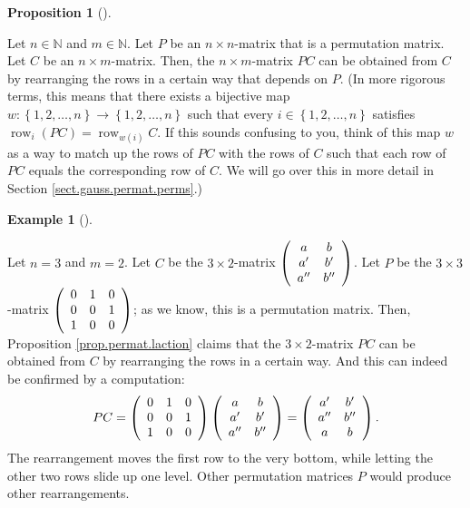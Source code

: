 \documentclass[numbers=enddot,12pt,final,onecolumn,notitlepage]{scrartcl}%
\theoremstyle{definition}
\newtheorem{prop}[theo]{Proposition}
\newenvironment{proposition}[1][]
{\begin{prop}[#1]\begin{leftbar}}
{\end{leftbar}\end{prop}}
\newtheorem{exam}[theo]{Example}
\newenvironment{example}[1][]
{\begin{exam}[#1]\begin{leftbar}}
{\end{leftbar}\end{exam}}
\begin{document}
\begin{proposition}
\label{prop.permat.laction}Let $n\in\mathbb{N}$ and $m\in\mathbb{N}$. Let $P$
be an $n\times n$-matrix that is a permutation matrix. Let $C$ be an $n\times
m$-matrix. Then, the $n\times m$-matrix $PC$ can be obtained from $C$ by
rearranging the rows in a certain way that depends on $P$. (In more rigorous
terms, this means that there exists a bijective map $w:\left\{  1,2,\ldots
,n\right\}  \rightarrow\left\{  1,2,\ldots,n\right\}  $ such that every
$i\in\left\{  1,2,\ldots,n\right\}  $ satisfies $\operatorname*{row}%
\nolimits_{i}\left(  PC\right)  =\operatorname*{row}\nolimits_{w\left(
i\right)  }C$. If this sounds confusing to you, think of this map $w$ as a way
to match up the rows of $PC$ with the rows of $C$ such that each row of $PC$
equals the corresponding row of $C$. We will go over this in more detail in
Section \ref{sect.gauss.permat.perms}.)
\end{proposition}

\begin{example}
Let $n=3$ and $m=2$. Let $C$ be the $3\times2$-matrix $\left(
\begin{array}
[c]{cc}%
a & b\\
a^{\prime} & b^{\prime}\\
a^{\prime\prime} & b^{\prime\prime}%
\end{array}
\right)  $. Let $P$ be the $3\times3$-matrix $\left(
\begin{array}
[c]{ccc}%
0 & 1 & 0\\
0 & 0 & 1\\
1 & 0 & 0
\end{array}
\right)  $; as we know, this is a permutation matrix. Then, Proposition
\ref{prop.permat.laction} claims that the $3\times2$-matrix $PC$ can be
obtained from $C$ by rearranging the rows in a certain way. And this can
indeed be confirmed by a computation:%
\[
PC=\left(
\begin{array}
[c]{ccc}%
0 & 1 & 0\\
0 & 0 & 1\\
1 & 0 & 0
\end{array}
\right)  \left(
\begin{array}
[c]{cc}%
a & b\\
a^{\prime} & b^{\prime}\\
a^{\prime\prime} & b^{\prime\prime}%
\end{array}
\right)  =\left(
\begin{array}
[c]{cc}%
a^{\prime} & b^{\prime}\\
a^{\prime\prime} & b^{\prime\prime}\\
a & b
\end{array}
\right)  .
\]
The rearrangement moves the first row to the very bottom, while letting the
other two rows slide up one level. Other permutation matrices $P$ would
produce other rearrangements.
\end{example}
\end{document}
